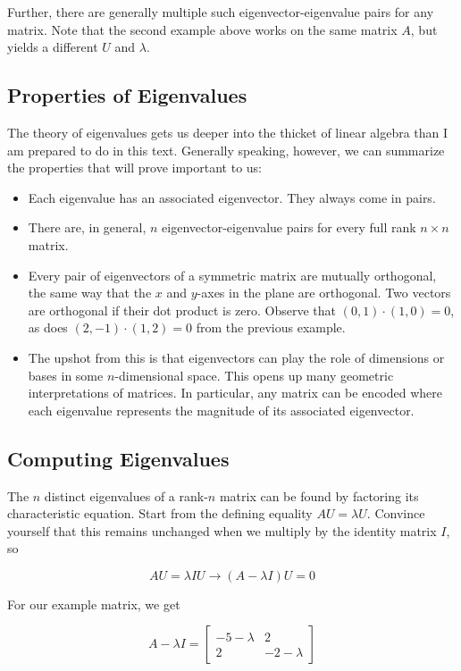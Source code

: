 \documentclass[10pt]{article}
\begin{document}
Further, there are generally multiple such eigenvector-eigenvalue pairs for any matrix. Note that the second example above works on the same matrix \(A\), but yields a different \(U\) and \(\lambda\).

\subsection*{Properties of Eigenvalues}
The theory of eigenvalues gets us deeper into the thicket of linear algebra than I am prepared to do in this text. Generally speaking, however, we can summarize the properties that will prove important to us:

\begin{itemize}
  \item Each eigenvalue has an associated eigenvector. They always come in pairs.
  \item There are, in general, \(n\) eigenvector-eigenvalue pairs for every full rank \(n \times n\) matrix.
  \item Every pair of eigenvectors of a symmetric matrix are mutually orthogonal, the same way that the \(x\) and \(y\)-axes in the plane are orthogonal. Two vectors are orthogonal if their dot product is zero. Observe that \((0,1) \cdot (1,0)=0\), as does \((2,-1) \cdot (1,2)=0\) from the previous example.
  \item The upshot from this is that eigenvectors can play the role of dimensions or bases in some \(n\)-dimensional space. This opens up many geometric interpretations of matrices. In particular, any matrix can be encoded where each eigenvalue represents the magnitude of its associated eigenvector.
\end{itemize}

\subsection*{Computing Eigenvalues}
The \(n\) distinct eigenvalues of a rank-\(n\) matrix can be found by factoring its characteristic equation. Start from the defining equality \(AU=\lambda U\). Convince yourself that this remains unchanged when we multiply by the identity matrix \(I\), so

\[
AU=\lambda IU \rightarrow (A-\lambda I) U=0
\]

For our example matrix, we get

\[
A-\lambda I=\begin{bmatrix}
-5-\lambda & 2 \\
2 & -2-\lambda
\end{bmatrix}
\]
\end{document}
